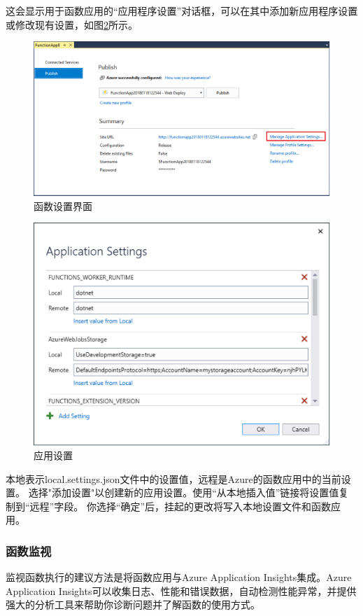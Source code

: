 \documentclass[11pt]{article}
\begin{document}
这会显示用于函数应用的“应用程序设置”对话框，可以在其中添加新应用程序设置或修改现有设置，如图\ref{fig12}所示。
\begin{figure}[h]	
	\centering
	\includegraphics[scale=0.6]{figs/11.png}        %
	\caption{函数设置界面}
	\label{fig11}	
\end{figure}
\begin{figure}[h]	
	\centering
	\includegraphics[scale=0.6]{figs/12.png}        %
	\caption{应用设置}
	\label{fig12}	
\end{figure}

本地表示local.settings.json文件中的设置值，远程是Azure的函数应用中的当前设置。 选择"添加设置"以创建新的应用设置。使用“从本地插入值”链接将设置值复制到“远程”字段。 你选择“确定”后，挂起的更改将写入本地设置文件和函数应用。

\subsubsection{函数监视}
监视函数执行的建议方法是将函数应用与Azure Application Insights集成。Azure Application Insights可以收集日志、性能和错误数据，自动检测性能异常，并提供强大的分析工具来帮助你诊断问题并了解函数的使用方式。
\end{document}
